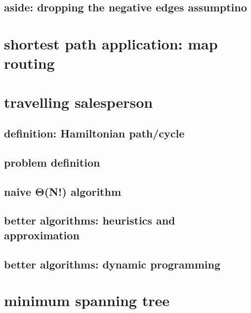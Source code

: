 \subsection{aside: dropping the negative edges assumptino}

\section{shortest path application: map routing} %

\section{travelling salesperson}

\subsection{definition: Hamiltonian path/cycle}

\subsection{problem definition}

\subsection{naive Θ(N!) algorithm}

\subsection{better algorithms: heuristics and approximation}

\subsection{better algorithms: dynamic programming}

\section{minimum spanning tree}

